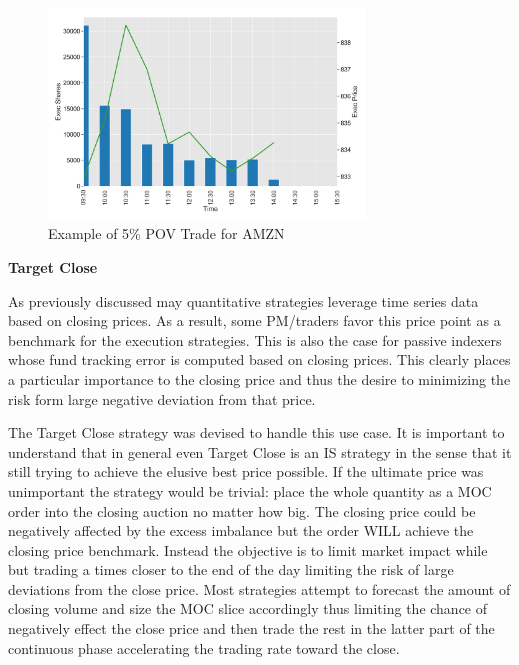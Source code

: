 	\begin{figure}[!ht]
	\centering
	\includegraphics[width=0.75\textwidth]{chapters/chapter_exec_models/figures/pov.png} 
	\caption{Example of 5\% POV Trade for AMZN \label{fig:pov}}
	\end{figure}


\noindent\textbf{Target Close} \twomedskip

As previously discussed may quantitative strategies leverage time series data based on closing prices. As a result, some PM/traders favor this price point as a benchmark for the execution strategies. This is also the case for passive indexers whose fund tracking error is computed based on closing prices. This clearly places a particular importance to the closing price and thus the desire to minimizing the risk form large negative deviation from that price.

The Target Close strategy was devised to handle this use case. It is important to understand that in general even Target Close is an IS strategy in the sense that it still trying to achieve the elusive best price possible. If the ultimate price was unimportant the strategy would be trivial: place the whole quantity as a MOC order into the closing auction no matter how big. The closing price could be negatively affected by the excess imbalance but the order WILL achieve the closing price benchmark. Instead the objective is to limit market impact while but trading a times closer to the end of the day limiting the risk of large deviations from the close price. Most strategies attempt to forecast the amount of closing volume and size the MOC slice accordingly thus limiting the chance of negatively effect the close price and then trade the rest in the latter part of the continuous phase accelerating the trading rate toward the close. \twomedskip

